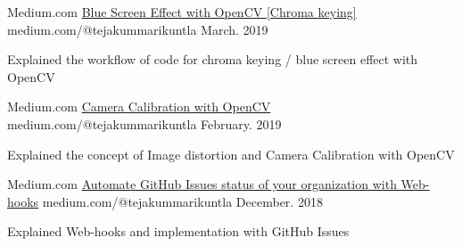 

\begin{cventries}

  \cventry
    {Medium.com} %
    {\href{https://link.medium.com/A2VvH6E8VU}{Blue Screen Effect with OpenCV [Chroma keying]}} %
    {medium.com/@tejakummarikuntla} %
    {March. 2019} %
    {
      \begin{cvitems} %
        \item {Explained the workflow of code for chroma keying / blue screen effect with OpenCV}
      \end{cvitems}
    }
    
    
    
  \cventry
    {Medium.com} %
    {\href{https://link.medium.com/6SlRdZGOZU}{Camera Calibration with OpenCV}} %
    {medium.com/@tejakummarikuntla} %
    {February. 2019} %
    {
      \begin{cvitems} %
        \item {Explained the concept of Image distortion and Camera Calibration with OpenCV}
      \end{cvitems}
    }
    
    
  \cventry
    {Medium.com} %
    {\href{https://link.medium.com/73slLFV8VU}{Automate GitHub Issues status of your organization with Web-hooks}} %
    {medium.com/@tejakummarikuntla} %
    {December. 2018} %
    {
      \begin{cvitems} %
        \item {Explained Web-hooks and implementation with GitHub Issues }
      \end{cvitems}
    }
\end{cventries}
